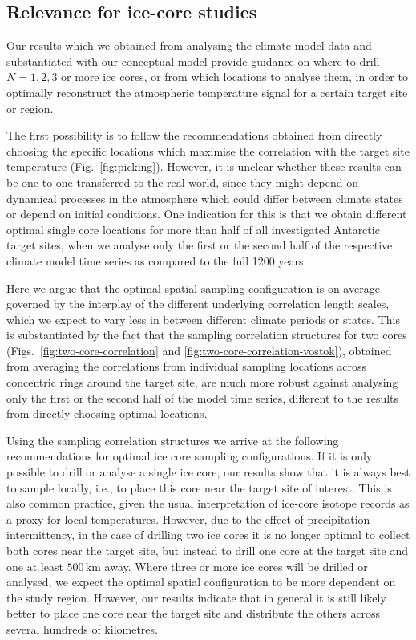 \documentclass[cp, manuscript]{copernicus}
\begin{document}
\subsection{Relevance for ice-core studies}
\label{discussion:relevance}

Our results which we obtained from analysing the climate model data and
substantiated with our conceptual model provide guidance on where to drill
$N=1, 2, 3$ or more ice cores, or from which locations to analyse them, in order
to optimally reconstruct the atmospheric temperature signal for a certain target
site or region.

The first possibility is to follow the recommendations obtained from directly
choosing the specific locations which maximise the correlation with the target
site temperature (Fig.~\ref{fig:picking}). However, it is unclear whether these
results can be one-to-one transferred to the real world, since they might depend
on dynamical processes in the atmosphere which could differ between climate
states or depend on initial conditions. One indication for this is that we
obtain different optimal single core locations for more than half of all
investigated Antarctic target sites, when we analyse only the first or the
second half of the respective climate model time series as compared to the full
1200 years.

Here we argue that the optimal spatial sampling configuration is on average
governed by the interplay of the different underlying correlation length scales,
which we expect to vary less in between different climate periods or states.
This is substantiated by the fact that the sampling correlation structures for
two cores (Figs.~\ref{fig:two-core-correlation} and
\ref{fig:two-core-correlation-vostok}), obtained from averaging the correlations
from individual sampling locations  across concentric rings around the target
site, are much more robust against analysing only the first or the second half
of the model time series, different to the results from directly choosing
optimal locations.

Using the sampling correlation structures we arrive at the following
recommendations for optimal ice core sampling configurations. If it is only
possible to drill or analyse a single ice core, our results show that it is
always best to sample locally, i.e., to place this core near the target site of
interest. This is also common practice, given the usual interpretation of
ice-core isotope records as a proxy for local temperatures. However, due to the
effect of precipitation intermittency, in the case of drilling two ice cores it
is no longer optimal to collect both cores near the target site, but instead to
drill one core at the target site and one at least $500$\,km away. Where three
or more ice cores will be drilled or analysed, we expect the optimal spatial
configuration to be more dependent on the study region. However, our results
indicate that in general it is still likely better to place one core near the
target site and distribute the others across several hundreds of kilometres.
\end{document}
